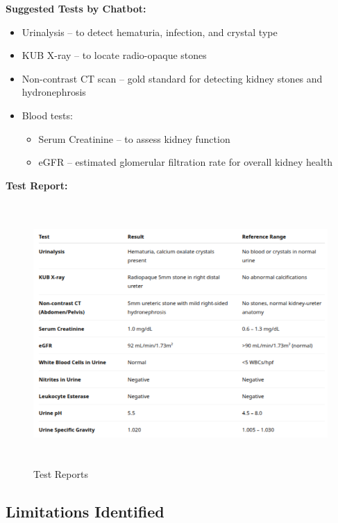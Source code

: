 \documentclass[12pt,a4paper]{report}
\begin{document}
\textbf{Suggested Tests by Chatbot:}
\begin{itemize}
    \item Urinalysis – to detect hematuria, infection, and crystal type
    \item KUB X-ray – to locate radio-opaque stones
    \item Non-contrast CT scan – gold standard for detecting kidney stones and hydronephrosis
    \item Blood tests:
    \begin{itemize}
        \item Serum Creatinine – to assess kidney function
        \item eGFR – estimated glomerular filtration rate for overall kidney health
    \end{itemize}
\end{itemize}

\textbf{Test Report:}
\begin{figure}[H]
    \centering
    \includegraphics[width=14cm, height=10cm]{TestReports}
    \caption{Test Reports}
    \label{fig:Blood Test Results}
\end{figure}



\subsection{Limitations Identified}
\label{Limitations Identified}
\end{document}

